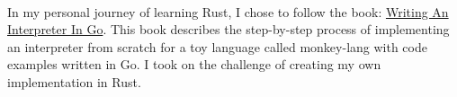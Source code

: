 \documentclass[a4paper]{MagicalCV}
\begin{document}
\begin{minipage}[t]{0.66\textwidth}

 \\

In my personal journey of learning Rust, I chose to follow the book: \href{https://interpreterbook.com/}{Writing An Interpreter In Go}. This book describes the step-by-step process of implementing an interpreter from scratch for a toy language called monkey-lang with code examples written in Go. I took on the challenge of creating my own implementation in Rust.

\sectionsep

\end{minipage} 

\printbibliography
\end{document}
